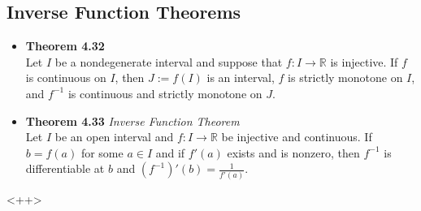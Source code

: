 \documentclass[11pt,a4paper]{article}
\begin{document}
\subsection{Inverse Function Theorems}

\begin{itemize}

    \item \textbf{Theorem 4.32} \\
        Let $I$ be a nondegenerate interval and suppose that $f : I \to \mathbb{R}$ is
        injective.
        If $f$ is continuous on $I$, then $J := f(I)$ is an interval, $f$ is strictly
        monotone on $I$, and $f^{-1}$ is continuous and strictly monotone on $J$.

    \item \textbf{Theorem 4.33} \emph{Inverse Function Theorem} \\
        Let $I$ be an open interval and $f : I \to \mathbb{R}$ be injective and continuous.
        If $b = f(a)$ for some $a \in I$ and if $f'(a)$ exists and is nonzero,
        then $f^{-1}$ is differentiable at $b$ and $(f^{-1})'(b) = \frac{1}{f'(a)}$.
\end{itemize}<++>
\end{document}
